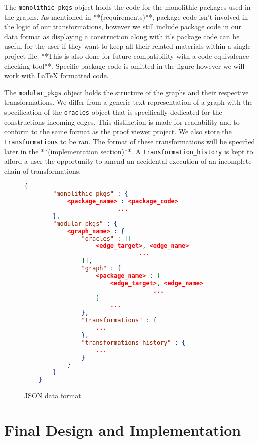 \documentclass[bsc,frontabs,singlespacing,parskip,deptreport]{infthesis}
\begin{document}
The \texttt{monolithic\_pkgs} object holds the code for the monolithic packages used in the graphs. As mentioned in **(requirements)**, package code isn't involved in the logic of our transformations, however we still include package code in our data format as displaying a construction along with it's package code can be useful for the user if they want to keep all their related materials within a single project file. **This is also done for future compatibility with a code equivalence checking tool**. Specific package code is omitted in the figure however we will work with {\LaTeX} formatted code. 

The \texttt{modular\_pkgs} object holds the structure of the graphs and their respective transformations. We differ from a generic text representation of a graph with the specification of the  \texttt{oracles} object that is specifically dedicated for the constructions incoming edges. This distinction is made for readability and to conform to the same format as the proof viewer project. We also store the \texttt{transformations} to be ran. The format of these transformations will be specified later in the **(implementation section)**. A \texttt{transformation\_history} is kept to afford a user the opportunity to amend an accidental execution of an incomplete chain of transformations.

\begin{figure}
    \centering
    \begin{lstlisting}[language=json,firstnumber=1]
    {
        "monolithic_pkgs" : {
            <package_name> : <package_code>
                          ...
        },
        "modular_pkgs" : {
            <graph_name> : {
                "oracles" : [[
                    <edge_target>, <edge_name>
                                ...
                ]],
                "graph" : {
                    <package_name> : [
                        <edge_target>, <edge_name>
                                    ...
                    ]
                        ...
                },
                "transformations" : {
                    ...
                }, 
                "transformations_history" : {
                    ... 
                }
            }
        }
    }
    \end{lstlisting}
    \caption{JSON data format}
    \label{code:df}
\end{figure}


\chapter{Final Design and Implementation}
\end{document}

